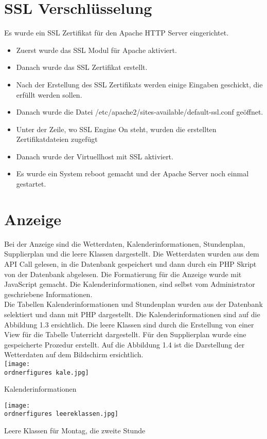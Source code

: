 \section{SSL Verschlüsselung}
Es wurde ein SSL Zertifikat für den Apache HTTP Server eingerichtet.
\begin{itemize}
	\item Zuerst wurde das SSL Modul für Apache aktiviert.
\end{itemize}
\begin{itemize}
	\item Danach wurde das SSL Zertifikat erstellt. 
\end{itemize}
\begin{itemize}
	\item Nach der Erstellung des SSL Zertifikats werden einige Eingaben geschickt, die erfüllt werden sollen. 
\end{itemize}
\begin{itemize}
	\item Danach wurde die Datei /etc/apache2/sites-available/default-ssl.conf geöffnet.
\end{itemize}
\begin{itemize}
	\item Unter der Zeile, wo SSL Engine On steht, wurden die erstellten Zertifikatdateien zugefügt
\end{itemize}
\begin{itemize}
	\item Danach wurde der Virtuellhost mit SSL aktiviert. 
\end{itemize}
\begin{itemize}
	\item Es wurde ein System reboot gemacht und der Apache Server noch einmal gestartet. \cite{50_SSS}
\end{itemize}
\section{Anzeige}
Bei der Anzeige sind die Wetterdaten, Kalenderinformationen, Stundenplan, Supplierplan und die leere Klassen dargestellt. Die Wetterdaten wurden aus dem API Call gelesen, in die Datenbank gespeichert und dann durch ein PHP Skript von der Datenbank abgelesen. Die Formatierung für die Anzeige wurde mit JavaScript gemacht. Die Kalenderinformationen, sind selbst vom Administrator geschriebene Informationen.  \\
Die Tabellen Kalenderinformationen und Stundenplan wurden aus der Datenbank selektiert und dann mit PHP dargestellt. Die Kalenderinformationen sind auf die Abbildung 1.3 ersichtlich. Die leere Klassen sind durch die Erstellung von einer View f\"ur die Tabelle Unterricht dargestellt. F\"ur den Supplierplan wurde eine gespeicherte Prozedur erstellt.
Auf die Abbildung 1.4 ist die Darstellung der Wetterdaten auf dem Bildschirm ersichtlich. \\
\captionsetup{type=figure}
\texttt{[image: \\ordnerfigures kale.jpg]}
\caption{Kalenderinformationen}
\label{Kalender} 
\captionsetup{type=figure}
 \captionsetup{type=figure}
 \texttt{[image: \\ordnerfigures leereklassen.jpg]}
 \caption{Leere Klassen f\"ur Montag, die zweite Stunde}
 \label{Leere} 
 \captionsetup{type=figure}
